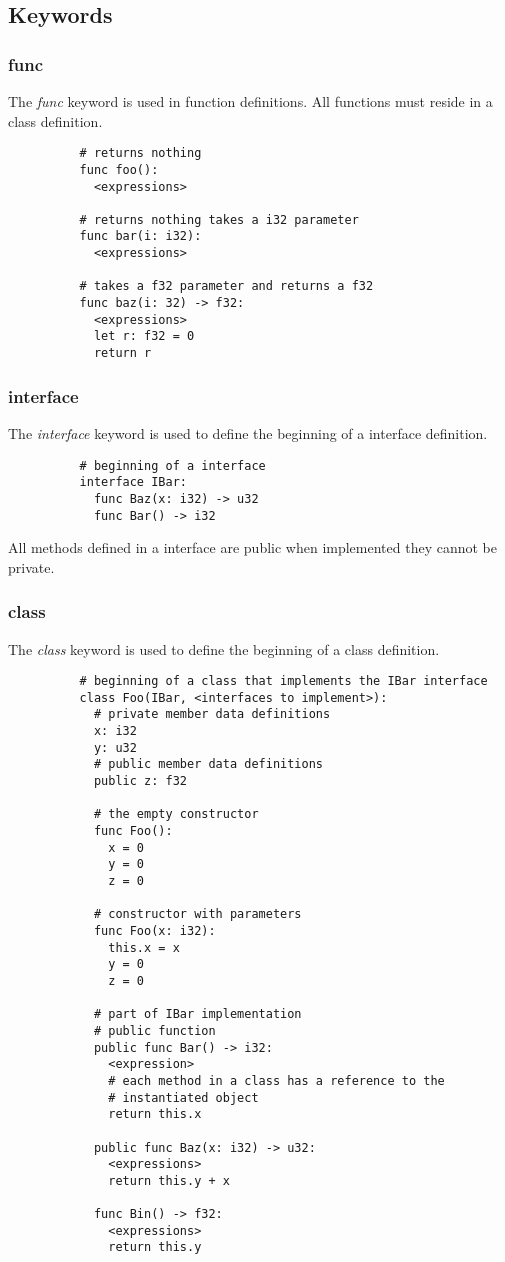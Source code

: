 \documentclass{article}
\newcommand{\subcentersec}[1]{\subsection*{\hfil #1 \hfil}}
\begin{document}
    \subcentersec{Keywords}
      \subsubsection*{func}
        The \textit{func} keyword is used in function definitions.
        All functions must reside in a class definition.
        \begin{verbatim}
          # returns nothing
          func foo():
            <expressions>

          # returns nothing takes a i32 parameter
          func bar(i: i32):
            <expressions>

          # takes a f32 parameter and returns a f32
          func baz(i: 32) -> f32:
            <expressions>
            let r: f32 = 0
            return r

        \end{verbatim}

      \subsubsection*{interface}
        The \textit{interface} keyword is used to define the beginning of a interface
        definition.
        \begin{verbatim}
          # beginning of a interface
          interface IBar:
            func Baz(x: i32) -> u32
            func Bar() -> i32
        \end{verbatim}
        All methods defined in a interface are public when
        implemented they cannot be private.

      \subsubsection*{class}
        The \textit{class} keyword is used to define the beginning of a class
        definition.
        \begin{verbatim}
          # beginning of a class that implements the IBar interface
          class Foo(IBar, <interfaces to implement>):
            # private member data definitions
            x: i32
            y: u32
            # public member data definitions
            public z: f32

            # the empty constructor
            func Foo():
              x = 0
              y = 0
              z = 0

            # constructor with parameters
            func Foo(x: i32):
              this.x = x
              y = 0
              z = 0

            # part of IBar implementation
            # public function
            public func Bar() -> i32:
              <expression>
              # each method in a class has a reference to the
              # instantiated object
              return this.x

            public func Baz(x: i32) -> u32:
              <expressions>
              return this.y + x

            func Bin() -> f32:
              <expressions>
              return this.y
        \end{verbatim}
\end{document}

